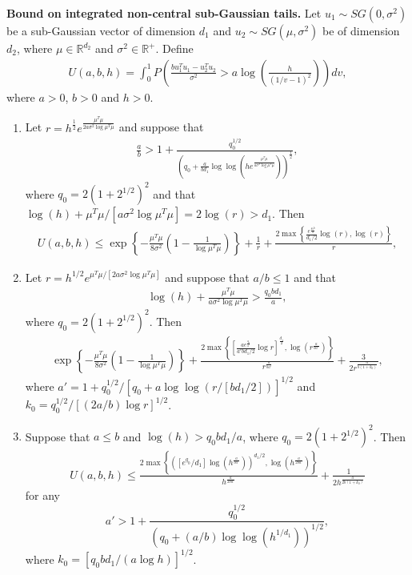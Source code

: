 \begin{prop} {\bf Bound on integrated non-central sub-Gaussian tails.}
Let $u_1 \sim SG(0,\sigma^2)$ be a sub-Gaussian vector of dimension $d_1$ and $u_2 \sim SG(\mu,\sigma^2)$ be of dimension $d_2$, where $\mu \in \mathbb{R}^{d_2}$ and $\sigma^2 \in \mathbb{R}^+$. Define
\begin{align}
 U(a,b,h)= \int_0^1 P \left( \frac{bu_1^Tu_1 - u_2^Tu_2}{\sigma^2} > a \log \left( \frac{h}{(1/v-1)^2} \right) \right) dv,
\nonumber
\end{align}
where $a>0$, $b>0$ and $h>0$.

\begin{enumerate}[leftmargin=*,label=(\roman*)]
\item Let $r=h^{\frac{1}{2}} e^{ \frac{\mu^T\mu}{2 a \sigma^2 \log \mu^T\mu}}$ and suppose that
\begin{align}
 \frac{a}{b} > 1 + \frac{q_0^{1/2}}{\left( q_0 + \frac{a}{b d_1} \log\log (h e^{ \frac{\mu^T\mu}{a \sigma^2 \log \mu^T\mu}}) \right)^{\frac{1}{2}}},
\nonumber
\end{align}
where $q_0= 2(1+2^{1/2})^2$ and that
$
 \log(h) + \mu^T\mu/[a \sigma^2 \log \mu^T\mu]= 2 \log(r) > d_1.
$
Then
\begin{align}
 U(a,b,h) \leq \exp \left\{ -\frac{\mu^T\mu}{8\sigma^2} \left( 1 - \frac{1}{\log \mu^T\mu} \right)\right\} +
\frac{1}{r} +
\frac{2 \max \left\{ \frac{e^{\frac{q_0b}{a}}}{d_1/2} \log \left(r \right) , \log \left( r \right)  \right\} }{r},
\nonumber
\end{align}


\item Let $r= h^{1/2} e^{\mu^T\mu/[2 a \sigma^2 \log \mu^T\mu]}$ and suppose that $a/b \leq 1$ and that
\begin{align}
  \log( h ) + \frac{\mu^T\mu}{a \sigma^2 \log \mu^T\mu} > \frac{q_0 b d_1}{a},
\nonumber
\end{align}
where $q_0=2 (1+2^{1/2})^2$. Then
\begin{align}
 \exp \left\{ -\frac{\mu^T\mu}{8\sigma^2} \left( 1 - \frac{1}{\log \mu^T\mu} \right)\right\} +
\frac{2 \max \left\{ \left[ \frac{a e^{\frac{q_0}{a'}}}{a'b d_1/2} \log r \right]^{\frac{d_1}{2}} , \log \left( r^{\frac{a}{b a'}} \right)  \right\}}{r^{\frac{a}{b a'}}}
+ \frac{3}{2 r^{\frac{a}{b (1+k_0)}}},
\nonumber
\end{align}
where $a'= 1 + q_0^{1/2}/[q_0 + a \log \log(r / [b d_1/2])]^{1/2}$ and
$k_0= q_0^{1/2}/[(2 a/b) \log r]^{1/2}$.


\item Suppose that $a \leq b$ and $\log(h) > q_0 b d_1/a$, where $q_0= 2(1+2^{1/2})^2$. Then
\begin{align}
 U(a,b,h) \leq \frac{2 \max \left\{([e^{q_0}/d_1] \log(h^{\frac{a}{b a'}}))^{d_1/2}  , \log(h^{\frac{a}{2b a'}}) \right\}}{h^{\frac{a}{2b a'}}}
+ \frac{1}{2 h^{\frac{a}{2b(1+k_0)}}}
\nonumber
\end{align}
for any 
$$
a'> 1 + \frac{q_0^{1/2}}{(q_0 + (a/b) \log \log (h^{1/d_1}))^{1/2}},
$$
where $k_0= [q_0b d_1/(a \log h)]^{1/2}$.


\end{enumerate}
\end{prop}
